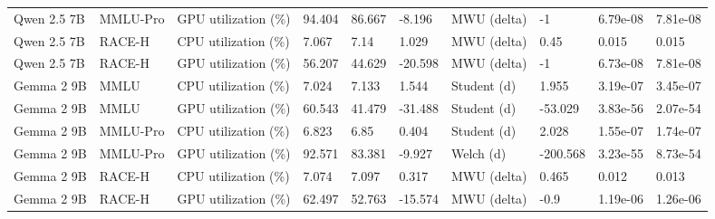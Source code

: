 \begin{table}[t]
{\begin{tabular}{llllllllll}
Qwen 2.5 7B & MMLU-Pro & GPU utilization (\%) & 94.404 & 86.667 & -8.196 & MWU (delta) & -1 & 6.79e-08 & 7.81e-08 \\
Qwen 2.5 7B & RACE-H & CPU utilization (\%) & 7.067 & 7.14 & 1.029 & MWU (delta) & 0.45 & 0.015 & 0.015 \\
Qwen 2.5 7B & RACE-H & GPU utilization (\%) & 56.207 & 44.629 & -20.598 & MWU (delta) & -1 & 6.73e-08 & 7.81e-08 \\
Gemma 2 9B & MMLU & CPU utilization (\%) & 7.024 & 7.133 & 1.544 & Student (d) & 1.955 & 3.19e-07 & 3.45e-07 \\
Gemma 2 9B & MMLU & GPU utilization (\%) & 60.543 & 41.479 & -31.488 & Student (d) & -53.029 & 3.83e-56 & 2.07e-54 \\
Gemma 2 9B & MMLU-Pro & CPU utilization (\%) & 6.823 & 6.85 & 0.404 & Student (d) & 2.028 & 1.55e-07 & 1.74e-07 \\
Gemma 2 9B & MMLU-Pro & GPU utilization (\%) & 92.571 & 83.381 & -9.927 & Welch (d) & -200.568 & 3.23e-55 & 8.73e-54 \\
Gemma 2 9B & RACE-H & CPU utilization (\%) & 7.074 & 7.097 & 0.317 & MWU (delta) & 0.465 & 0.012 & 0.013 \\
Gemma 2 9B & RACE-H & GPU utilization (\%) & 62.497 & 52.763 & -15.574 & MWU (delta) & -0.9 & 1.19e-06 & 1.26e-06 \\
\bottomrule
\end{tabular}
}
\end{table}

